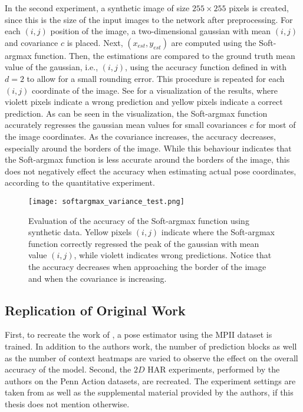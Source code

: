 In the second experiment, a synthetic image of size $255 \times 255$ pixels is created, since this is the size of the input images to the network after preprocessing.
For each $(i,j)$ position of the image, a two-dimensional gaussian with mean $(i,j)$ and covariance $c$ is placed.
Next, $(x_{est},y_{est})$ are computed using the Soft-argmax function.
Then, the estimations are compared to the ground truth mean value of the gaussian, i.e., $(i,j)$, using the accuracy function defined in  with $d=2$ to allow for a small rounding error.
This procedure is repeated for each $(i,j)$ coordinate of the image.
See  for a visualization of the results, where violett pixels indicate a wrong prediction and yellow pixels indicate a correct prediction.
As can be seen in the visualization, the Soft-argmax function accurately regresses the gaussian mean values for small covariances $c$ for most of the image coordinates.
As the covariance increases, the accuracy decreases, especially around the borders of the image.
While this behaviour indicates that the Soft-argmax function is less accurate around the borders of the image, this does not negatively effect the accuracy when estimating actual pose coordinates, according to the quantitative experiment.

\begin{figure}[htb!]
    \centering
    \texttt{[image: softargmax\_variance\_test.png]}
    \caption{Evaluation of the accuracy of the Soft-argmax function using synthetic data. Yellow pixels $(i,j)$ indicate where the Soft-argmax function correctly regressed the peak of the gaussian with mean value $(i,j)$, while violett indicates wrong predictions. Notice that the accuracy decreases when approaching the border of the image and when the covariance is increasing. }
    \label{fig:softargmax_variance_test}
\end{figure}

\subsection{Replication of Original Work}
\label{sec:exp-replication}

First, to recreate the work of \cite{luvizon_2d/3d_2018}, a pose estimator using the MPII dataset is trained.
In addition to the authors work, the number of prediction blocks as well as the number of context heatmaps are varied to observe the effect on the overall accuracy of the model.
Second, the $2D$ HAR experiments, performed by the authors on the Penn Action datasets, are recreated.
The experiment settings are taken from \cite{luvizon_2d/3d_2018} as well as the supplemental material provided by the authors, if this thesis does not mention otherwise.

